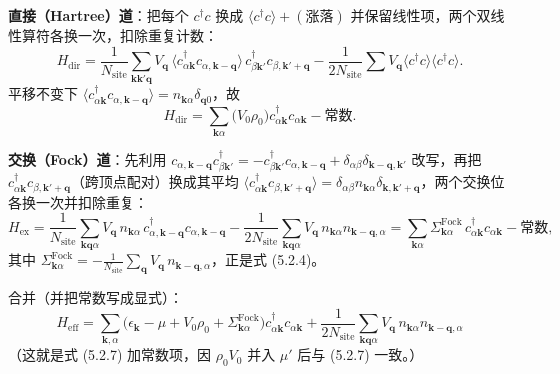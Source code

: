 \textbf{直接（Hartree）道}：把每个 $c^{\dagger}c$ 换成 $\langle c^{\dagger}c\rangle+(\text{涨落})$ 并保留线性项，两个双线性算符各换一次，扣除重复计数：
\begin{equation*}
H_{\mathrm{dir}}=\frac{1}{N_{\mathrm{site}}}\sum_{\pmb{k}\pmb{k}'\pmb{q}}V_{\pmb{q}}\,
\langle c^{\dagger}_{\alpha\pmb{k}}c_{\alpha,\pmb{k}-\pmb{q}}\rangle\,c^{\dagger}_{\beta\pmb{k}'}c_{\beta,\pmb{k}'+\pmb{q}}
-\frac{1}{2N_{\mathrm{site}}}\sum V_{\pmb{q}}\langle c^{\dagger}c\rangle\langle c^{\dagger}c\rangle .
\end{equation*}
平移不变下 $\langle c^{\dagger}_{\alpha\pmb{k}}c_{\alpha,\pmb{k}-\pmb{q}}\rangle=n_{\pmb{k}\alpha}\delta_{\pmb{q}0}$，故
\begin{equation*}
H_{\mathrm{dir}}=\sum_{\pmb{k}\alpha}\big(V_0\rho_0\big)c^{\dagger}_{\alpha\pmb{k}}c_{\alpha\pmb{k}}-\text{常数}.
\end{equation*}

\textbf{交换（Fock）道}：先利用 $c_{\alpha,\pmb{k}-\pmb{q}}c^{\dagger}_{\beta\pmb{k}'}=-c^{\dagger}_{\beta\pmb{k}'}c_{\alpha,\pmb{k}-\pmb{q}}+\delta_{\alpha\beta}\delta_{\pmb{k}-\pmb{q},\pmb{k}'}$ 改写，再把 $c^{\dagger}_{\alpha\pmb{k}}c_{\beta,\pmb{k}'+\pmb{q}}$（跨顶点配对）换成其平均 $\langle c^{\dagger}_{\alpha\pmb{k}}c_{\beta,\pmb{k}'+\pmb{q}}\rangle=\delta_{\alpha\beta}n_{\pmb{k}\alpha}\delta_{\pmb{k},\pmb{k}'+\pmb{q}}$，两个交换位各换一次并扣除重复：
\begin{equation*}
H_{\mathrm{ex}}=\frac{1}{N_{\mathrm{site}}}\sum_{\pmb{k}\pmb{q}\alpha}V_{\pmb{q}}\,n_{\pmb{k}\alpha}\,
c^{\dagger}_{\alpha,\pmb{k}-\pmb{q}}c_{\alpha,\pmb{k}-\pmb{q}}
-\frac{1}{2N_{\mathrm{site}}}\sum_{\pmb{k}\pmb{q}\alpha}V_{\pmb{q}}\,n_{\pmb{k}\alpha}n_{\pmb{k}-\pmb{q},\alpha}
=\sum_{\pmb{k}\alpha}\Sigma^{\mathrm{Fock}}_{\pmb{k}\alpha}\,c^{\dagger}_{\alpha\pmb{k}}c_{\alpha\pmb{k}}-\text{常数},
\end{equation*}
其中 $\Sigma^{\mathrm{Fock}}_{\pmb{k}\alpha}=-\frac{1}{N_{\mathrm{site}}}\sum_{\pmb{q}}V_{\pmb{q}}\,n_{\pmb{k}-\pmb{q},\alpha}$，正是式 (5.2.4)。

合并（并把常数写成显式）：
\begin{equation*}
\boxed{\;H_{\mathrm{eff}}=\sum_{\pmb{k},\alpha}\big(\epsilon_{\pmb{k}}-\mu+V_0\rho_0+\Sigma^{\mathrm{Fock}}_{\pmb{k}\alpha}\big)c^{\dagger}_{\alpha\pmb{k}}c_{\alpha\pmb{k}}
+\frac{1}{2N_{\mathrm{site}}}\sum_{\pmb{k}\pmb{q}\alpha}V_{\pmb{q}}\,n_{\pmb{k}\alpha}n_{\pmb{k}-\pmb{q},\alpha}\;}
\end{equation*}
（这就是式 (5.2.7) 加常数项，因 $\rho_0V_0$ 并入 $\mu'$ 后与 (5.2.7) 一致。）

